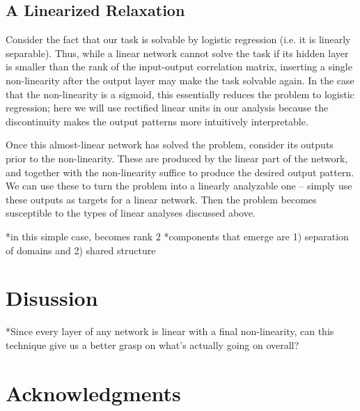 \documentclass[10pt,letterpaper]{article}
\begin{document}
\subsection{A Linearized Relaxation}
Consider the fact that our task is solvable by logistic regression (i.e. it is linearly separable). Thus, while a linear network cannot solve the task if its hidden layer is smaller than the rank of the input-output correlation matrix, inserting a single non-linearity after the output layer may make the task solvable again. In the case that the non-linearity is a sigmoid, this essentially reduces the problem to logistic regression; here we will use rectified linear units in our analysis because the discontinuity makes the output patterns more intuitively interpretable. \par 
Once this almost-linear network has solved the problem, consider its outputs prior to the non-linearity. These are produced by the linear part of the network, and together with the non-linearity suffice to produce the desired output pattern. We can use these to turn the problem into a linearly analyzable one -- simply use these outputs as targets for a linear network. Then the problem becomes susceptible to the types of linear analyses discussed above. \par 

*in this simple case, becomes rank 2
    *components that emerge are 1) separation of domains and 2) shared structure 




\section{Disussion}
*Since every layer of any network is linear with a final non-linearity, can this technique give us a better grasp on what's actually going on overall?
\section{Acknowledgments}



\setlength{\bibleftmargin}{.125in}
\setlength{\bibindent}{-\bibleftmargin}


\end{document}
